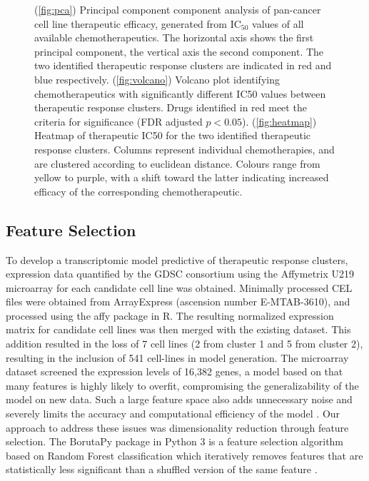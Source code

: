 \documentclass[10pt, letterpaper]{article}
\begin{document}
\begin{multicols}{2}
\begin{figure}[!ht]
    \caption{(\ref{fig:pca}) Principal component component analysis of pan-cancer cell line therapeutic efficacy, generated from IC$_{50}$ values of all available chemotherapeutics. The horizontal axis shows the first principal component, the vertical axis the second component. The two identified therapeutic response clusters are indicated in red and blue respectively. (\ref{fig:volcano}) Volcano plot identifying chemotherapeutics with significantly different IC50 values between therapeutic response clusters. Drugs identified in red meet the criteria for significance (FDR adjusted $p<0.05$). (\ref{fig:heatmap}) Heatmap of therapeutic IC50 for the two identified therapeutic response clusters. Columns represent individual chemotherapies, and are clustered according to euclidean distance. Colours range from yellow to purple, with a shift toward the latter indicating increased efficacy of the corresponding chemotherapeutic.}
    \label{fig:clustering}
\end{figure}


\subsection*{Feature Selection}
To develop a transcriptomic model predictive of therapeutic response clusters, expression data quantified by the GDSC consortium using the Affymetrix U219 microarray for each candidate cell line was obtained. Minimally processed CEL files were obtained from ArrayExpress (ascension number E-MTAB-3610), and processed using the affy package in R. The resulting normalized expression matrix for candidate cell lines was then merged with the existing dataset. This addition resulted in the loss of 7 cell lines (2 from cluster 1 and 5 from cluster 2), resulting in the inclusion of 541 cell-lines in model generation. The microarray dataset screened the expression levels of 16,382 genes, a model based on that many features is highly likely to overfit, compromising the generalizability of the model on new data. Such a large feature space also adds unnecessary noise and severely limits the accuracy and computational efficiency of the model \cite{liu}. Our approach to address these issues was dimensionality reduction through feature selection. The BorutaPy package in Python 3 is a feature selection algorithm based on Random Forest classification which iteratively removes features that are statistically less significant than a shuffled version of the same feature \cite{kursa}.



\end{multicols}
\end{document}
